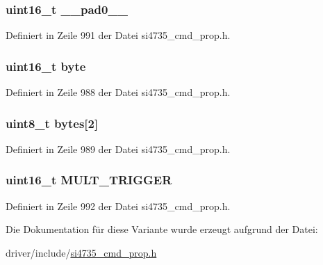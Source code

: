 \subsubsection[{\+\_\+\+\_\+pad0\+\_\+\+\_\+}]{\setlength{\rightskip}{0pt plus 5cm}uint16\+\_\+t \+\_\+\+\_\+pad0\+\_\+\+\_\+}\label{unionfm__hicut__multi__trigger__thres_a77132c2c26a75f5b8751b235cda23828}


Definiert in Zeile 991 der Datei si4735\+\_\+cmd\+\_\+prop.\+h.

\hypertarget{unionfm__hicut__multi__trigger__thres_ab0549c1b5ea980a02e7eab77e21fea49}{}
\subsubsection[{byte}]{\setlength{\rightskip}{0pt plus 5cm}uint16\+\_\+t byte}\label{unionfm__hicut__multi__trigger__thres_ab0549c1b5ea980a02e7eab77e21fea49}


Definiert in Zeile 988 der Datei si4735\+\_\+cmd\+\_\+prop.\+h.

\hypertarget{unionfm__hicut__multi__trigger__thres_a46e4c05d20a047ec169f60d3167e912e}{}
\subsubsection[{bytes}]{\setlength{\rightskip}{0pt plus 5cm}uint8\+\_\+t bytes\mbox{[}2\mbox{]}}\label{unionfm__hicut__multi__trigger__thres_a46e4c05d20a047ec169f60d3167e912e}


Definiert in Zeile 989 der Datei si4735\+\_\+cmd\+\_\+prop.\+h.

\hypertarget{unionfm__hicut__multi__trigger__thres_ac92332e1bbf71748b389eacaab7e2501}{}
\subsubsection[{M\+U\+L\+T\+\_\+\+T\+R\+I\+G\+G\+E\+R}]{\setlength{\rightskip}{0pt plus 5cm}uint16\+\_\+t M\+U\+L\+T\+\_\+\+T\+R\+I\+G\+G\+E\+R}\label{unionfm__hicut__multi__trigger__thres_ac92332e1bbf71748b389eacaab7e2501}


Definiert in Zeile 992 der Datei si4735\+\_\+cmd\+\_\+prop.\+h.



Die Dokumentation für diese Variante wurde erzeugt aufgrund der Datei\+:\begin{DoxyCompactItemize}
\item 
driver/include/\hyperlink{si4735__cmd__prop_8h}{si4735\+\_\+cmd\+\_\+prop.\+h}\end{DoxyCompactItemize}
